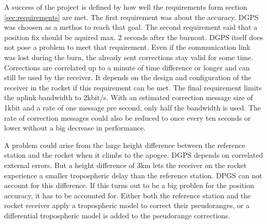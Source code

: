 A success of the project is defined by how well the requirements form section \ref{sec:requirements} are met.
The first requirement was about the accuracy.
DGPS was choosen as a methos to reach that goal.
The second requirement said that a position fix should be aquired max. 2 seconds after the burnout.
DGPS itself does not pose a problem to meet that requirement.
Even if the communication link was lost during the burn, the already sent corrections stay valid for some time.
Corrections are correlated up to a minute of time difference or longer and can still be used by the receiver.
It depends on the design and configuration of the receiver in the rocket if this requirement can be met.
The final requirement limits the uplink bandwidth to 2kbit/s.
With an estimated correction message size of 1kbit and a rate of one message pre second, only half the bandwidth is used.
The rate of correction messages could also be reduced to once every ten seconds or lower without a big decrease in performance.

A problem could arise from the large height difference between the reference station and the rocket when it climbs to the apogee.
DGPS depends on correlated external errors.
But a height difference of 3km lets the receiver on the rocket experience a smaller tropospheric delay than the reference station.
DPGS can not account for this difference.
If this turns out to be a big problen for the position accuracy, it has to be accounted for.
Either both the reference station and the rocket receiver apply a tropospheric model to correct their pseudoranges, or a differential tropospheric model is added to the pseudorange corrections.